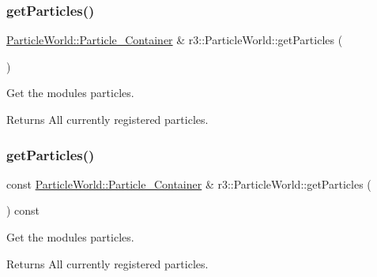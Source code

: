 \subsubsection{\texorpdfstring{get\+Particles()}{getParticles()}\hspace{0.1cm}{\footnotesize\ttfamily [1/2]}}
{\footnotesize\ttfamily \mbox{\hyperlink{classr3_1_1_particle_world_aa354f6786c0837674fe8286f00465631}{Particle\+World\+::\+Particle\+\_\+\+Container}} \& r3\+::\+Particle\+World\+::get\+Particles (\begin{DoxyParamCaption}{ }\end{DoxyParamCaption})}



Get the module\textquotesingle{}s particles. 

\begin{DoxyReturn}{Returns}
All currently registered particles. 
\end{DoxyReturn}
\mbox{\label{classr3_1_1_particle_world_ab816d6bca8b42fdf16170275087008f0}} 
\subsubsection{\texorpdfstring{get\+Particles()}{getParticles()}\hspace{0.1cm}{\footnotesize\ttfamily [2/2]}}
{\footnotesize\ttfamily const \mbox{\hyperlink{classr3_1_1_particle_world_aa354f6786c0837674fe8286f00465631}{Particle\+World\+::\+Particle\+\_\+\+Container}} \& r3\+::\+Particle\+World\+::get\+Particles (\begin{DoxyParamCaption}{ }\end{DoxyParamCaption}) const}



Get the module\textquotesingle{}s particles. 

\begin{DoxyReturn}{Returns}
All currently registered particles. 
\end{DoxyReturn}
\mbox{\label{classr3_1_1_particle_world_a7c2b9a7345016ad344d4439d807dadc3}} 

